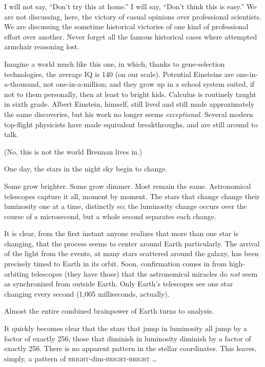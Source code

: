{
 I will not say, ``Don't try this
at home.'' I will say,
``Don't think this is
easy.'' We are not discussing, here, the victory of
casual opinions over professional scientists. We are discussing the
sometime historical victories of one kind of professional effort over
another. Never forget all the famous historical cases where attempted
armchair reasoning lost.}

\myendsectiontext


\bigskip


{
 Imagine a world much like this one, in which, thanks to
gene-selection technologies, the average IQ is 140 (on our scale).
Potential Einsteins are one-in-a-thousand, not one-in-a-million; and
they grow up in a school system suited, if not to them personally, then
at least to bright kids. Calculus is routinely taught in sixth grade.
Albert Einstein, himself, still lived and still made approximately the
same discoveries, but his work no longer seems \textit{exceptional.}
Several modern top-flight physicists have made equivalent
breakthroughs, and are still around to talk. }

{
 (No, this is not the world Brennan lives in.)}

{
 One day, the stars in the night sky begin to change.}

{
 Some grow brighter. Some grow dimmer. Most remain the same.
Astronomical telescopes capture it all, moment by moment. The stars
that change change their luminosity one at a time, distinctly so; the
luminosity change occurs over the course of a microsecond, but a whole
second separates each change.}

{
 It is clear, from the first instant anyone realizes that more than
one star is changing, that the process seems to center around Earth
particularly. The arrival of the light from the events, at many stars
scattered around the galaxy, has been precisely timed to Earth in its
orbit. Soon, confirmation comes in from high-orbiting telescopes (they
have those) that the astronomical miracles do \textit{not} seem as
synchronized from outside Earth. Only Earth's
telescopes see one star changing every second (1,005 milliseconds,
actually).}

{
 Almost the entire combined brainpower of Earth turns to analysis.}

{
 It quickly becomes clear that the stars that jump in luminosity
all jump by a factor of exactly 256; those that diminish in luminosity
diminish by a factor of exactly 256. There is no apparent pattern in
the stellar coordinates. This leaves, simply, a pattern of
\textsc{bright}-dim-\textsc{bright}-\textsc{bright} \ldots}

